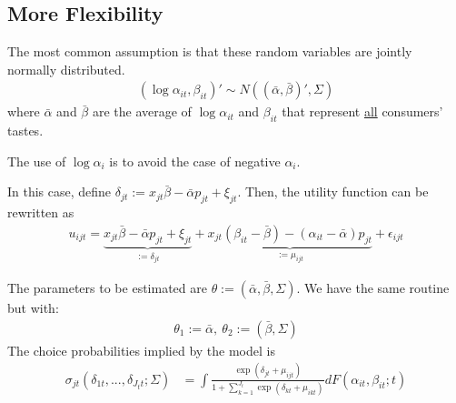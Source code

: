 \documentclass[11pt]{elegantbook}
\begin{document}
\subsection{More Flexibility}
The most common assumption is that these random variables are jointly normally distributed.
\begin{equation}
    \begin{aligned}
        (\log\alpha_{it},\beta_{it})'\sim N\left((\bar{\alpha},\bar{\beta})',\Sigma\right)
    \end{aligned}
    \nonumber
\end{equation}
where $\bar{\alpha}$ and $\bar{\beta}$ are the average of $\log\alpha_{it}$ and $\beta_{it}$ that represent \underline{all} consumers' tastes.
\begin{note}
    The use of $\log \alpha_i$ is to avoid the case of negative $\alpha_i$.
\end{note}

In this case, define $\delta_{jt}:=x_{jt}\bar{\beta}-\bar{\alpha}p_{jt}+\xi_{jt}$. Then, the utility function can be rewritten as
\begin{equation}
    \begin{aligned}
        u_{ijt}=\underbrace{x_{jt}\bar{\beta}-\bar{\alpha}p_{jt}+\xi_{jt}}_{:=\delta_{jt}}+\underbrace{x_{jt}(\beta_{it}-\bar{\beta})-(\alpha_{it}-\bar{\alpha})p_{jt}}_{:=\mu_{ijt}}+\epsilon_{ijt}
    \end{aligned}
    \nonumber
\end{equation}

The parameters to be estimated are $\theta:=(\bar{\alpha},\bar{\beta},\Sigma)$. We have the same routine but with:
\begin{equation}
    \begin{aligned}
        \theta_1:=\bar{\alpha},\ \theta_2:=(\bar{\beta},\Sigma)
    \end{aligned}
    \nonumber
\end{equation}
The choice probabilities implied by the model is
\begin{equation}
    \begin{aligned}
        \sigma_{jt}\left(\delta_{1t},...,\delta_{J_tt};\Sigma\right)&=\int \frac{\exp(\delta_{jt}+\mu_{ijt})}{1+\sum_{k=1}^{J_t}\exp(\delta_{kt}+\mu_{ikt})}d F(\alpha_{it},\beta_{it};t)\\
    \end{aligned}
    \nonumber
\end{equation}
\end{document}
